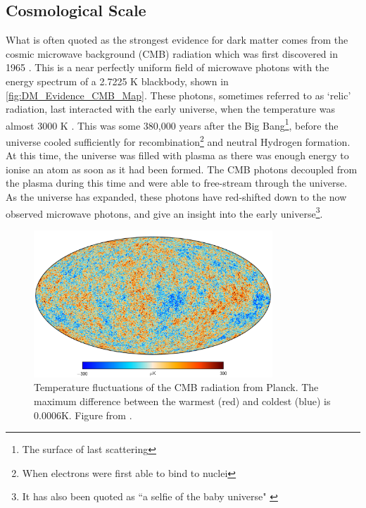 \subsection{Cosmological Scale}

\par
What is often quoted as the strongest evidence for dark matter comes from the cosmic microwave background (CMB) radiation which was first discovered in 1965 \cite{cmb_origins_ref}.
This is a near perfectly uniform field of microwave photons with the energy spectrum of a 2.7225 K blackbody, shown in \autoref{fig:DM_Evidence_CMB_Map}.
These photons, sometimes referred to as `relic' radiation, last interacted with the early universe, when the temperature was almost 3000 K \cite{bigbang_nucleosynthesis_ref}.
This was some 380,000 years after the Big Bang\footnote{The surface of last scattering}, before the universe cooled sufficiently for recombination\footnote{When electrons were first able to bind to nuclei} and neutral Hydrogen formation.
At this time, the universe was filled with plasma as there was enough energy to ionise an atom as soon as it had been formed.
The CMB photons decoupled from the plasma during this time and were able to free-stream through the universe.
As the universe has expanded, these photons have red-shifted down to the now observed microwave photons, and give an insight into the early universe\footnote{It has also been quoted as ``a selfie of the baby universe" \cite{marisarthurs_thesis_ref}}.

\begin{figure}[]%
    \centering
    \includegraphics[width=0.8\textwidth]{Figures/DarkMatterEvidence/cmb_radiation.png}
    \caption[Temperature fluctuations of the CMB radiation]{Temperature fluctuations of the CMB radiation from Planck.
             The maximum difference between the warmest (red) and coldest (blue) is 0.0006K.
             Figure from \cite{plank_result_ref}.}
    \label{fig:DM_Evidence_CMB_Map}
\end{figure}

